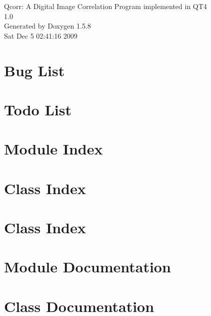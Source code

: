 \documentclass[a4paper]{book}
\begin{document}
\begin{titlepage}
\vspace*{7cm}
\begin{center}
{\Large Qcorr: A Digital Image Correlation Program implemented in QT4 \\[1ex]\large 1.0 }\\
\vspace*{1cm}
{\large Generated by Doxygen 1.5.8}\\
\vspace*{0.5cm}
{\small Sat Dec 5 02:41:16 2009}\\
\end{center}
\end{titlepage}
\clearemptydoublepage
{}
\tableofcontents
\clearemptydoublepage
{}
\chapter{Bug List}
\label{bug}
\hypertarget{bug}{}

\chapter{Todo List}
\label{todo}
\hypertarget{todo}{}

\chapter{Module Index}

\chapter{Class Index}

\chapter{Class Index}

\chapter{Module Documentation}

\chapter{Class Documentation}


\printindex
\end{document}
